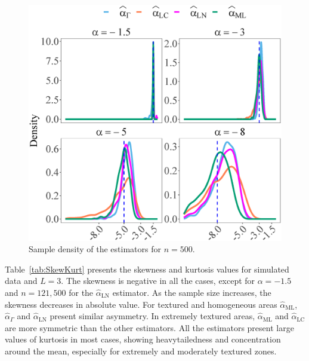 \documentclass[twocolumn]{svjour3}
\begin{document}
\begin{figure}[hbt]
\centering
\includegraphics[width=1\linewidth]{../Figures/Asymptotic_n500_TodoAlfa}
\caption{\label{Fig:Densities_n500} Sample density of the estimators for $n=500$. }\label{Fig:DistEstimator}
\end{figure}

Table~\ref{tab:SkewKurt} presents the skewness and kurtosis values for simulated data and $L=3$. 
The skewness is negative in all the cases, except for $\alpha=-1.5$ and $n=121,500$ for the $\widehat{\alpha}_{\text{{LN}}}$ estimator. 
As the sample size increases, the skewness decreases in absolute value. 
For textured and homogeneous areas $\widehat{\alpha}_{\text{{ML}}}$, $\widehat{\alpha}_{\Gamma}$ and $\widehat{\alpha}_{\text{{LN}}}$ present similar asymmetry. 
In extremely textured areas, $\widehat{\alpha}_{\text{{ML}}}$ and $\widehat{\alpha}_{\text{{LC}}}$ are more symmetric than the other estimators.
All the estimators present large values of kurtosis in most cases, showing heavytailedness and concentration around the mean, especially for extremely and moderately textured zones.
\end{document}
